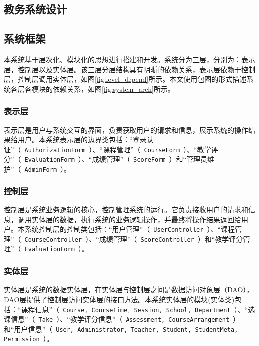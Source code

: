 \begin{center}
  \section{教务系统设计}
\end{center}

\subsection{系统框架}\label{sec:system_frame}
本系统基于层次化、模块化的思想进行搭建和开发。系统分为三层，分别为：表示层，控制层以及实体层。该三层分层结构具有明晰的依赖关系，表示层依赖于控制层，控制层调用实体层，如图\ref{fig:level_depend}所示。本文使用包图的形式描述系统各层各模块的依赖关系，如图\ref{fig:system_arch}所示。

\subsubsection{表示层}
  
表示层是用户与系统交互的界面，负责获取用户的请求和信息，展示系统的操作结果给用户。本系统表示层的边界类包括：“登录认证”（~\texttt{AuthorizationForm}~）、“课程管理”（~\texttt{CourseForm}~）、“教学评分”（~\texttt{EvaluationForm}~）、“成绩管理”（~\texttt{ScoreForm}~）和“管理员维护”（~\texttt{AdminForm}~）。
  
\subsubsection{控制层}
  
控制层是系统业务逻辑的核心，控制管理系统的运行。它负责接收用户的请求和信息，调用实体层的数据，执行系统的业务逻辑操作，并最终将操作结果返回给用户。本系统控制层的控制类包括：“用户管理”（~\texttt{UserController}~）、“课程管理”（~\texttt{CourseController}~）、“成绩管理”（~\texttt{ScoreController}~）和“教学评分管理”（~\texttt{EvaluationForm}~）。
  
\subsubsection{实体层}
  
实体层是系统的数据实体层，在实体层与控制层之间是数据访问对象层（DAO），DAO层提供了控制层访问实体层的接口方法。本系统实体层的模块(实体类)包括：“课程信息”（~\texttt{Course, CourseTime, Session, School, Department}~）、“选课信息”（~\texttt{Take}~）、“教学评分信息”（~\texttt{Assessment, CourseArrangement}~）和“用户信息”（~\texttt{User, Administrator, Teacher, Student, StudentMeta, Permission}~）。


